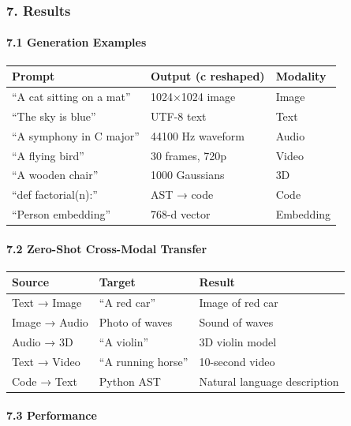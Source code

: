 \documentclass[
  11pt,
  a4paper,
]{article}
\begin{document}
\subsubsection{7. Results}\label{results}

\paragraph{7.1 Generation Examples}\label{generation-examples}

\begin{longtable}[]{@{}lll@{}}
\toprule\noalign{}
Prompt & Output (c reshaped) & Modality \\
\midrule\noalign{}
\endhead
\bottomrule\noalign{}
\endlastfoot
``A cat sitting on a mat'' & 1024×1024 image & Image \\
``The sky is blue'' & UTF-8 text & Text \\
``A symphony in C major'' & 44100 Hz waveform & Audio \\
``A flying bird'' & 30 frames, 720p & Video \\
``A wooden chair'' & 1000 Gaussians & 3D \\
``def factorial(n):'' & AST → code & Code \\
``Person embedding'' & 768-d vector & Embedding \\
\end{longtable}

\paragraph{7.2 Zero-Shot Cross-Modal
Transfer}\label{zero-shot-cross-modal-transfer-1}

\begin{longtable}[]{@{}lll@{}}
\toprule\noalign{}
Source & Target & Result \\
\midrule\noalign{}
\endhead
\bottomrule\noalign{}
\endlastfoot
Text → Image & ``A red car'' & Image of red car \\
Image → Audio & Photo of waves & Sound of waves \\
Audio → 3D & ``A violin'' & 3D violin model \\
Text → Video & ``A running horse'' & 10-second video \\
Code → Text & Python AST & Natural language description \\
\end{longtable}

\paragraph{7.3 Performance}\label{performance}
\end{document}
